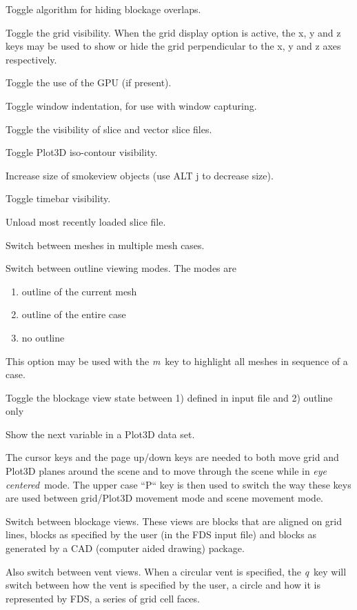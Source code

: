 \documentclass[11pt,twoside]{book}
\newcommand{\kitem}[1]{\item[{\bf {\tt #1 \  }} \hfill]}
\begin{document}
\kitem{F}Toggle algorithm for hiding blockage overlaps.

\kitem{g}Toggle the grid visibility.  When the grid display option
is active, the x, y and z keys may be used to show or hide the
grid perpendicular to the x, y and z axes respectively.

\kitem{G}Toggle the use of the GPU (if present).

 \kitem{h}Toggle window indentation, for use with window
capturing.

\kitem{H}Toggle the visibility of slice and vector slice files.

\kitem{i,I}Toggle Plot3D iso-contour visibility.

\kitem{j,J}Increase size of smokeview objects (use ALT j to decrease size).

\kitem{k,K}Toggle timebar visibility.

\kitem{L}Unload most recently loaded slice file.


\kitem{m,M}Switch between meshes in multiple mesh cases.

\kitem{o}Switch between outline viewing modes. The modes are
\begin{enumerate}
\item outline of the current mesh
\item outline of the entire case
\item no outline
\end{enumerate}
This option may be used with the {\em m}\ key to highlight all meshes in sequence of a case.

\kitem{O}Toggle the blockage view state between 1) defined in input file and 2) outline only

\kitem{p}Show the next variable in a Plot3D data set.

\kitem{P}The cursor keys and the page up/down keys are needed to
both move grid and Plot3D planes around the scene and to move
through the scene while in {\em eye centered}\ mode.  The upper
case ``P`` key is then used to switch the way these keys are used
between grid/Plot3D movement mode and scene movement mode.


\kitem{q,Q}Switch between blockage views.  These views are blocks
that are aligned on grid lines, blocks as specified by the user
(in the FDS input file) and blocks as generated by a CAD (computer
aided drawing) package.

Also switch between vent views.  When a circular vent is specified,
the {\em q}\ key will switch between how the vent is specified by the user, a circle
and how it is represented by FDS, a series of grid cell faces.
\end{document}
